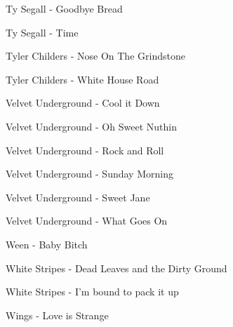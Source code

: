 Ty Segall - Goodbye Bread \dotfill \pageref{Goodbye Bread - Ty Segall} 

Ty Segall - Time \dotfill \pageref{Time - Ty Segall} 

Tyler Childers - Nose On The Grindstone \dotfill \pageref{Nose On The Grindstone - Tyler Childers} 

Tyler Childers - White House Road \dotfill \pageref{White House Road - Tyler Childers} 

Velvet Underground - Cool it Down \dotfill \pageref{Cool it Down - Velvet Underground} 

Velvet Underground - Oh Sweet Nuthin \dotfill \pageref{Oh Sweet Nuthin - Velvet Underground} 

Velvet Underground - Rock and Roll \dotfill \pageref{Rock and Roll - Velvet Underground} 

Velvet Underground - Sunday Morning \dotfill \pageref{Sunday Morning - Velvet Underground} 

Velvet Underground - Sweet Jane \dotfill \pageref{Sweet Jane - Velvet Underground} 

Velvet Underground - What Goes On \dotfill \pageref{What Goes On - Velvet Underground} 

Ween - Baby Bitch \dotfill \pageref{Baby Bitch - Ween} 

White Stripes - Dead Leaves and the Dirty Ground \dotfill \pageref{Dead Leaves and the Dirty Ground - White Stripes} 

White Stripes - I'm bound to pack it up \dotfill \pageref{I'm bound to pack it up - White Stripes} 

Wings - Love is Strange \dotfill \pageref{Love is Strange - Wings} 

